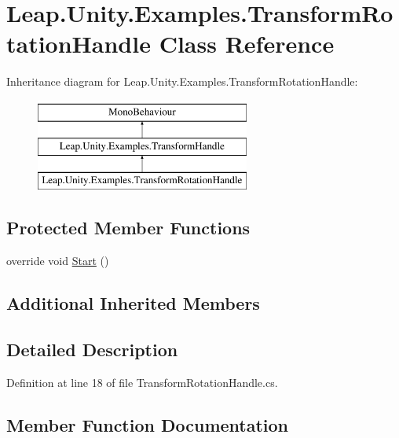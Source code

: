 \hypertarget{class_leap_1_1_unity_1_1_examples_1_1_transform_rotation_handle}{}\section{Leap.\+Unity.\+Examples.\+Transform\+Rotation\+Handle Class Reference}
\label{class_leap_1_1_unity_1_1_examples_1_1_transform_rotation_handle}
Inheritance diagram for Leap.\+Unity.\+Examples.\+Transform\+Rotation\+Handle\+:\begin{figure}[H]
\begin{center}
\leavevmode
\includegraphics[height=3.000000cm]{class_leap_1_1_unity_1_1_examples_1_1_transform_rotation_handle}
\end{center}
\end{figure}
\subsection*{Protected Member Functions}
\begin{DoxyCompactItemize}
\item 
override void \mbox{\hyperlink{class_leap_1_1_unity_1_1_examples_1_1_transform_rotation_handle_a37171ac787856ac86358e300c11f4707}{Start}} ()
\end{DoxyCompactItemize}
\subsection*{Additional Inherited Members}


\subsection{Detailed Description}


Definition at line 18 of file Transform\+Rotation\+Handle.\+cs.



\subsection{Member Function Documentation}
\mbox{\label{class_leap_1_1_unity_1_1_examples_1_1_transform_rotation_handle_a37171ac787856ac86358e300c11f4707}} 
